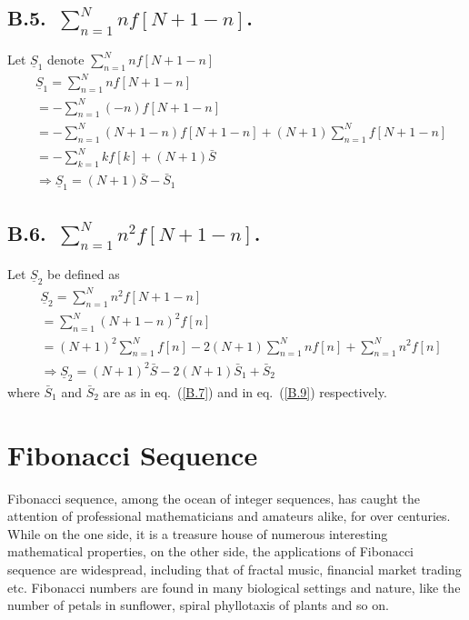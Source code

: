 \begin{multicols}{2}
\subsection*{B.5.~$\displaystyle{\sum_{n=1}^{N}nf[N+1-n]}$.}
Let $\underline{S}_1$ denote $\displaystyle{\sum_{n=1}^{N}nf[N+1-n]}$
\begin{align}
&\underline{S}_1 = \displaystyle{\sum_{n=1}^{N}nf[N+1-n]}\nonumber\\
&= -\displaystyle{\sum_{n=1}^{N}(-n)f[N+1-n]}\nonumber\\
&= - \displaystyle{\sum_{n=1}^{N}(N+1-n)f[N+1-n]} + (N+1)\displaystyle{\sum_{n=1}^{N}f[N+1-n]}\nonumber\\
&= - \displaystyle{\sum_{k=1}^{N}kf[k] + (N+1)\bar{S}}\nonumber\\
&\Rightarrow  \underline{S}_1 = (N+1)\bar{S} - \bar{S}_1\tag{B.14}\label{B.14}
\end{align}

\subsection*{B.6.~$\displaystyle{\sum_{n=1}^{N}n^2f[N+1-n]}$.}
Let $\underline{S}_2$ be defined as
\begin{align}
&\underline{S}_2  = \displaystyle{\sum_{n=1}^{N}n^2f[N+1-n]}\nonumber\\
&= \displaystyle{\sum_{n=1}^{N}(N+1-n)^2f[n]}\nonumber\\
&= (N+1)^2 \displaystyle{\sum_{n=1}^Nf[n]} - 2(N+1)\displaystyle{\sum_{n=1}^N nf[n]} + \displaystyle{\sum_{n=1}^N n^2f[n]}\nonumber\\
&\Rightarrow \underline{S}_2 = (N+1)^2\bar{S} -2(N+1)\bar{S}_1 + \bar{S}_2\tag{B.15}\label{B.15}
\end{align}
where $\bar{S}_1$ and $\bar{S}_2$ are as in eq.~(\ref{B.7}) and in eq.~(\ref{B.9}) respectively.


\section{Fibonacci Sequence}\label{section-21}

Fibonacci sequence, among the ocean of integer sequences, has caught the attention of professional mathematicians and amateurs alike, for over centuries. While on the one side, it is a treasure house of numerous interesting mathematical properties, on the other side, the applications of Fibonacci sequence are widespread, including that of fractal music, financial market trading etc. Fibonacci numbers are found in many biological settings and nature, like the number of petals in sunflower, spiral phyllotaxis of plants and so on.


\end{multicols}
